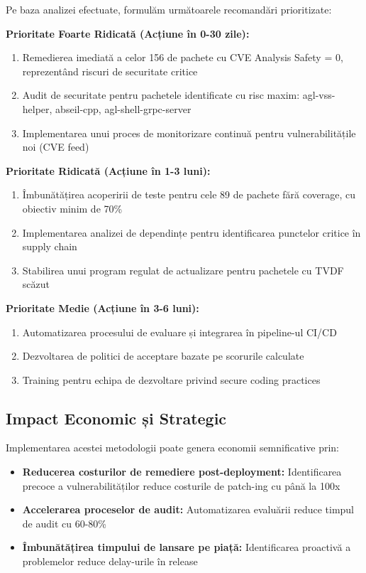 \documentclass[12pt,a4paper]{article}
\begin{document}
Pe baza analizei efectuate, formulăm următoarele recomandări prioritizate:

\textbf{Prioritate Foarte Ridicată (Acțiune în 0-30 zile):}
\begin{enumerate}
\item Remedierea imediată a celor 156 de pachete cu CVE Analysis Safety = 0, reprezentând riscuri de securitate critice
\item Audit de securitate pentru pachetele identificate cu risc maxim: agl-vss-helper, abseil-cpp, agl-shell-grpc-server
\item Implementarea unui proces de monitorizare continuă pentru vulnerabilitățile noi (CVE feed)
\end{enumerate}

\textbf{Prioritate Ridicată (Acțiune în 1-3 luni):}
\begin{enumerate}
\item Îmbunătățirea acoperirii de teste pentru cele 89 de pachete fără coverage, cu obiectiv minim de 70\%
\item Implementarea analizei de dependințe pentru identificarea punctelor critice în supply chain
\item Stabilirea unui program regulat de actualizare pentru pachetele cu TVDF scăzut
\end{enumerate}

\textbf{Prioritate Medie (Acțiune în 3-6 luni):}
\begin{enumerate}
\item Automatizarea procesului de evaluare și integrarea în pipeline-ul CI/CD
\item Dezvoltarea de politici de acceptare bazate pe scorurile calculate
\item Training pentru echipa de dezvoltare privind secure coding practices
\end{enumerate}

\subsection{Impact Economic și Strategic}

Implementarea acestei metodologii poate genera economii semnificative prin:

\begin{itemize}
\item \textbf{Reducerea costurilor de remediere post-deployment:} Identificarea precoce a vulnerabilităților reduce costurile de patch-ing cu până la 100x
\item \textbf{Accelerarea proceselor de audit:} Automatizarea evaluării reduce timpul de audit cu 60-80\%
\item \textbf{Îmbunătățirea timpului de lansare pe piață:} Identificarea proactivă a problemelor reduce delay-urile în release
\end{itemize}
\end{document}
